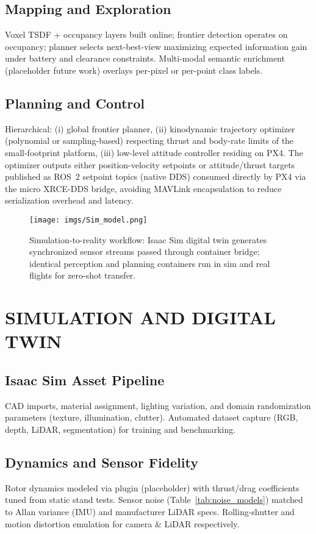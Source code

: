 \documentclass[letterpaper, 10 pt, conference]{ieeeconf}  %
\begin{document}
\subsection{Mapping and Exploration}
Voxel TSDF + occupancy layers built online; frontier detection operates on occupancy; planner selects next-best-view maximizing expected information gain under battery and clearance constraints. Multi-modal semantic enrichment (placeholder future work) overlays per-pixel or per-point class labels.
\subsection{Planning and Control}
Hierarchical: (i) global frontier planner, (ii) kinodynamic trajectory optimizer (polynomial or sampling-based) respecting thrust and body-rate limits of the small-footprint platform, (iii) low-level attitude controller residing on PX4. The optimizer outputs either position-velocity setpoints or attitude/thrust targets published as ROS~2 setpoint topics (native DDS) consumed directly by PX4 via the micro XRCE-DDS bridge, avoiding MAVLink encapsulation to reduce serialization overhead and latency.
\begin{figure}[t]
        \centering
        \texttt{[image: imgs/Sim\_model.png]}
        \caption{Simulation-to-reality workflow: Isaac Sim digital twin generates synchronized sensor streams passed through container bridge; identical perception and planning containers run in sim and real flights for zero-shot transfer.}
        \label{fig:sim_pipeline}
\end{figure}

\section{SIMULATION AND DIGITAL TWIN}
\subsection{Isaac Sim Asset Pipeline}
CAD imports, material assignment, lighting variation, and domain randomization parameters (texture, illumination, clutter). Automated dataset capture (RGB, depth, LiDAR, segmentation) for training and benchmarking.
\subsection{Dynamics and Sensor Fidelity}
Rotor dynamics modeled via plugin (placeholder) with thrust/drag coefficients tuned from static stand tests. Sensor noise (Table~\ref{tab:noise_models}) matched to Allan variance (IMU) and manufacturer LiDAR specs. Rolling-shutter and motion distortion emulation for camera \& LiDAR respectively.
\end{document}
